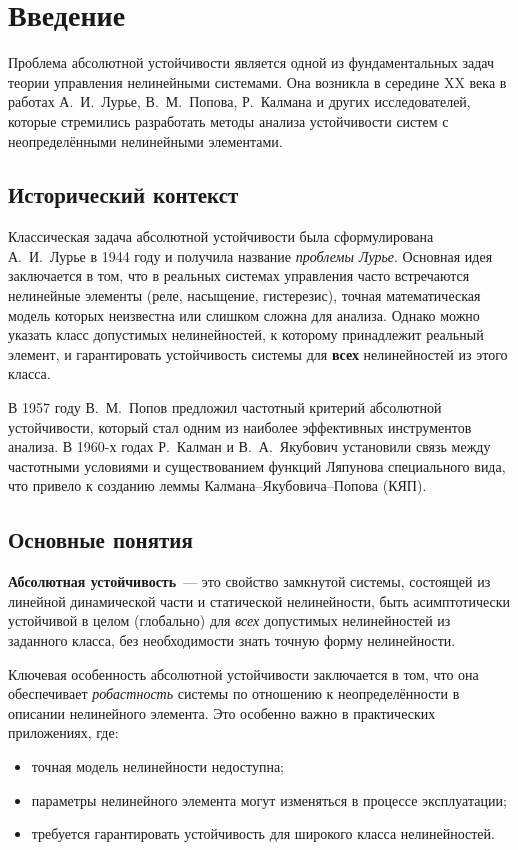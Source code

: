 \chapter{Введение}

Проблема абсолютной устойчивости является одной из фундаментальных задач теории управления нелинейными системами. Она возникла в середине XX века в работах А.~И.~Лурье, В.~М.~Попова, Р.~Калмана и других исследователей, которые стремились разработать методы анализа устойчивости систем с неопределёнными нелинейными элементами.

\section{Исторический контекст}

Классическая задача абсолютной устойчивости была сформулирована А.~И.~Лурье в 1944 году и получила название \emph{проблемы Лурье}. Основная идея заключается в том, что в реальных системах управления часто встречаются нелинейные элементы (реле, насыщение, гистерезис), точная математическая модель которых неизвестна или слишком сложна для анализа. Однако можно указать класс допустимых нелинейностей, к которому принадлежит реальный элемент, и гарантировать устойчивость системы для \textbf{всех} нелинейностей из этого класса.

В 1957 году В.~М.~Попов предложил частотный критерий абсолютной устойчивости, который стал одним из наиболее эффективных инструментов анализа. В 1960-х годах Р.~Калман и В.~А.~Якубович установили связь между частотными условиями и существованием функций Ляпунова специального вида, что привело к созданию леммы Калмана--Якубовича--Попова (КЯП).

\section{Основные понятия}

\textbf{Абсолютная устойчивость}~--- это свойство замкнутой системы, состоящей из линейной динамической части и статической нелинейности, быть асимптотически устойчивой в целом (глобально) для \emph{всех} допустимых нелинейностей из заданного класса, без необходимости знать точную форму нелинейности.

Ключевая особенность абсолютной устойчивости заключается в том, что она обеспечивает \emph{робастность} системы по отношению к неопределённости в описании нелинейного элемента. Это особенно важно в практических приложениях, где:
\begin{itemize}
    \item точная модель нелинейности недоступна;
    \item параметры нелинейного элемента могут изменяться в процессе эксплуатации;
    \item требуется гарантировать устойчивость для широкого класса нелинейностей.
\end{itemize}

